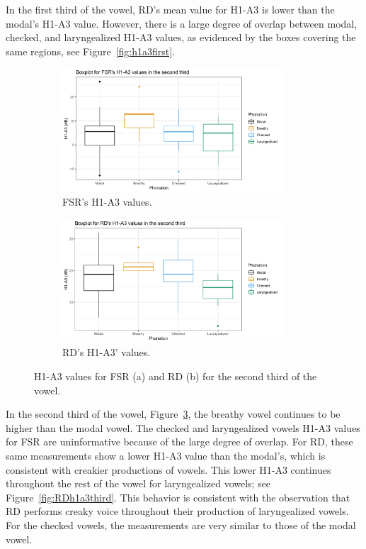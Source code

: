 \documentclass[12pt, letterpaper]{article}
\begin{document}
In the first third of the vowel, RD's mean value for H1-A3 is lower than the modal's H1-A3 value. However, there is a large degree of overlap between modal, checked, and laryngealized H1-A3 values, as evidenced by the boxes covering the same regions, see Figure~\ref{fig:h1a3first}. 

\begin{figure}[!h]
	\centering
	\begin{subfigure}{.5\textwidth}
		\centering
		\includegraphics[width=0.9\textwidth]{Images/mean_FSR_h1a3_Second.png}
		\caption{FSR's H1-A3 values.}
		\label{fig:FSRh1a3second} 
	\end{subfigure}%
	\begin{subfigure}{.5\textwidth}
		\centering
		\includegraphics[width=0.9\textwidth]{Images/mean_RD_h1a3_Second.png}
		\caption{RD's H1-A3' values.}
		\label{fig:RDh1a3second} 
	\end{subfigure}
	\caption{H1-A3 values for FSR (a) and RD (b) for the second third of the vowel. }
	\label{fig:h1a3second}
\end{figure}

In the second third of the vowel, Figure~\ref{fig:h1a3second}, the breathy vowel continues to be higher than the modal vowel. The checked and laryngealized vowels H1-A3 values for FSR are uninformative because of the large degree of overlap. For RD, these same measurements show a lower H1-A3 value than the modal's, which is consistent with creakier productions of vowels. This lower H1-A3 continues throughout the rest of the vowel for laryngealized vowels; see Figure~\ref{fig:RDh1a3third}. This behavior is consistent with the observation that RD performs creaky voice throughout their production of laryngealized vowels. For the checked vowels, the measurements are very similar to those of the modal vowel. 
\end{document}
